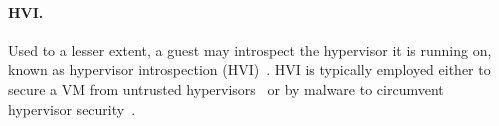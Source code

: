 \documentclass[11pt]{article}
\newcommand{\hide}[1]{}
\begin{document}
\paragraph{HVI.} Used to a lesser extent, a guest may introspect the hypervisor it is running on, 
known as hypervisor introspection (HVI)~\cite{wang2015hypervisor, shi2016hardware}. HVI is
 typically employed either to secure a VM from untrusted hypervisors~\cite{shih2016s} or by
  malware to circumvent hypervisor security~\cite{rutkowska08,mishra2017intrusion}.

\hide{
Introspection is also used, to a lesser extent, from the VM OS to learn about the hypervisor it is running on, known as hypervisor introspection (HVI)~\cite{wang2015hypervisor, shi2016hardware}. While HVI is typically employed either to secure a VM from an untrusted hypervisor~\cite{shih2016s} or by malware to circumvent hypervisor security mechanisms~\cite{rutkowska08,mishra2017intrusion}, it could also be used by an altruistic VM to release resources when a hypervisor is under pressure, or to optimize I/O access patterns.
}
\end{document}
